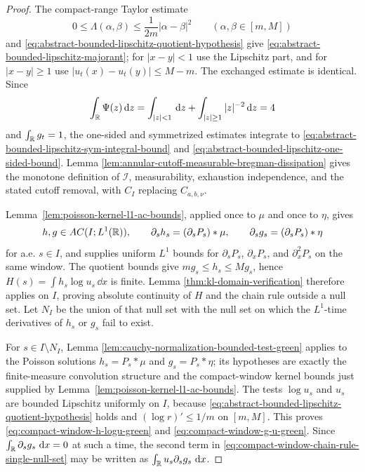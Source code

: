 \begin{proof}
The compact-range Taylor estimate
\[
0\le\Lambda(\alpha,\beta)\le\frac{1}{2m}|\alpha-\beta|^2
\qquad(\alpha,\beta\in[m,M])
\]
and \eqref{eq:abstract-bounded-lipschitz-quotient-hypothesis} give
\eqref{eq:abstract-bounded-lipschitz-majorant}; for \(|x-y|<1\) use the
Lipschitz part, and for \(|x-y|\ge1\) use \(|u_t(x)-u_t(y)|\le M-m\).  The
exchanged estimate is identical.  Since
\[
\int_{\mathbb{R}}\Psi(z)\,\mathrm{d} z
=\int_{|z|<1}\,\mathrm{d} z+\int_{|z|\ge1}|z|^{-2}\,\mathrm{d} z=4
\]
and \(\int_{\mathbb{R}}g_t=1\), the one-sided and symmetrized estimates integrate to
\eqref{eq:abstract-bounded-lipschitz-sym-integral-bound} and
\eqref{eq:abstract-bounded-lipschitz-one-sided-bound}.  Lemma
\ref{lem:annular-cutoff-measurable-bregman-dissipation} gives the monotone
definition of \(\mathscr I\), measurability, exhaustion independence, and the
stated cutoff removal, with \(C_I\) replacing \(C_{a,b,\nu}\).

Lemma~\ref{lem:poisson-kernel-l1-ac-bounds}, applied once to \(\mu\) and
once to \(\eta\), gives
\[
h,g\in AC(I;L^1(\mathbb{R})),\qquad
\partial_s h_s=(\partial_sP_s)*\mu,\qquad
\partial_s g_s=(\partial_sP_s)*\eta
\]
for a.e. \(s\in I\), and supplies uniform \(L^1\) bounds for
\(\partial_sP_s\), \(\partial_xP_s\), and \(\partial_x^2P_s\) on the same
window.  The quotient bounds give \(m g_s\le h_s\le M g_s\), hence
\(H(s)=\int h_s\log u_s\,\dd x\) is finite.  Lemma
\ref{thm:kl-domain-verification} therefore applies on \(I\), proving absolute
continuity of \(H\) and the chain rule outside a null set.  Let \(N_I\) be
the union of that null set with the null set on which the \(L^1\)-time
derivatives of \(h_s\) or \(g_s\) fail to exist.

For \(s\in I\setminus N_I\), Lemma
\ref{lem:cauchy-normalization-bounded-test-green} applies to the Poisson
solutions \(h_s=P_s*\mu\) and \(g_s=P_s*\eta\); its hypotheses are exactly
the finite-measure convolution structure and the compact-window kernel
bounds just supplied by Lemma~\ref{lem:poisson-kernel-l1-ac-bounds}.  The
tests \(\log u_s\) and \(u_s\) are bounded Lipschitz uniformly on \(I\), because
\eqref{eq:abstract-bounded-lipschitz-quotient-hypothesis} holds and
\((\log r)'\le1/m\) on \([m,M]\).  This proves
\eqref{eq:compact-window-h-logu-green} and
\eqref{eq:compact-window-g-u-green}.  Since \(\int_{\mathbb{R}}\partial_sg_s\,\,\mathrm{d} x=0\)
at such a time, the second term in
\eqref{eq:compact-window-chain-rule-single-null-set} may be written as
\(\int_{\mathbb{R}}u_s\partial_sg_s\,\,\mathrm{d} x\).


\end{proof}
